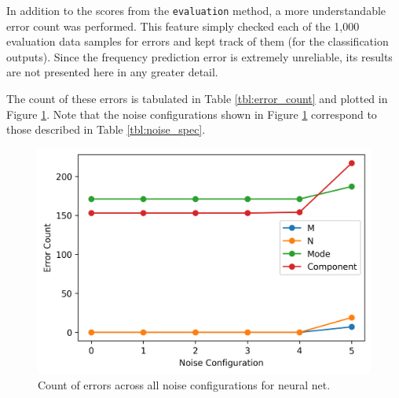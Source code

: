 \documentclass[conference]{IEEEtran}
\begin{document}
In addition to the scores from the \verb*|evaluation| method, a more understandable error count was performed.
This feature simply checked each of the 1,000 evaluation data samples for errors and kept track of them (for the classification outputs).
Since the frequency prediction error is extremely unreliable, its results are not presented here in any greater detail.

\begin{table}
	\centering
	\caption{Error Count for Evaluation Data from Neural Net}
	\setlength\extrarowheight{2pt}
	\label{tbl:error_count}
\end{table}

The count of these errors is tabulated in Table \ref{tbl:error_count} and plotted in Figure \ref{fig:error_count}.
Note that the noise configurations shown in Figure \ref{fig:error_count} correspond to those described in Table \ref{tbl:noise_spec}.

\begin{figure}
	\centering
	\includegraphics[width=1\linewidth]{images/error_count}
	\caption{Count of errors across all noise configurations for neural net.}
	\label{fig:error_count}
\end{figure}
\end{document}
